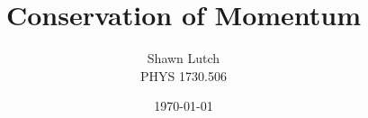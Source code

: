 \documentclass[12pt,letterpaper,titlepage]{report}
\newcommand{\myTitle}{Conservation of Momentum}
\newcommand{\myName}{Shawn Lutch}
\newcommand{\myPeriod}{PHYS 1730.506}
\begin{document}
\title{\myTitle{}}
\author{\myName{}\\ \myPeriod{}}
\date{\today}
\maketitle












    




\end{document}
